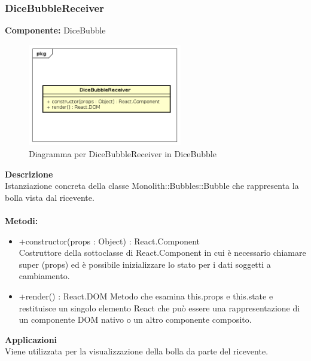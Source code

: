 \clearpage

\subsubsection{DiceBubbleReceiver}
\textbf{Componente:}  DiceBubble\\
   \FloatBarrier
   \begin{figure}[ht]
   \centering
   \includegraphics[width=0.6\textwidth]{img/single-DiceBubbleReceiver}
   \caption{{Diagramma per DiceBubbleReceiver in DiceBubble}}
\end{figure}
\FloatBarrier
\textbf{Descrizione}\\
Istanziazione concreta della classe Monolith::Bubbles::Bubble che rappresenta la bolla vista dal ricevente.
\\
\\
\textbf{Metodi:} 
\begin{itemize}
\item +constructor(props : Object) : React.Component 
\\
Costruttore della sottoclasse di React.Component in cui è necessario chiamare super (props) ed è possibile inizializzare lo stato per i dati soggetti a cambiamento.

\item +render() : React.DOM
Metodo che esamina this.props e this.state e restituisce un singolo elemento React che può essere una rappresentazione di un componente DOM nativo o un altro componente composito.

\end{itemize} 


\textbf{Applicazioni}\\
Viene utilizzata per la visualizzazione della bolla da parte del ricevente. 


\clearpage


